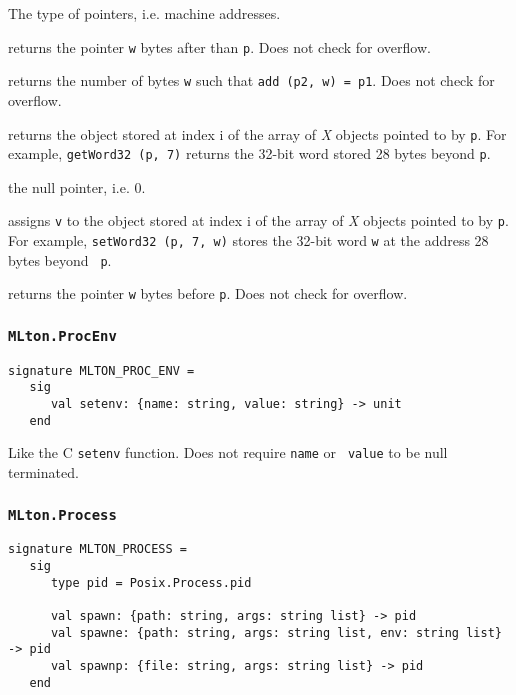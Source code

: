 \begin{description}
The type of pointers, i.e. machine addresses.

returns the pointer {\tt w} bytes after than {\tt p}.  Does not check
for overflow.

returns the number of bytes {\tt w} such that {\tt add (p2, w) = p1}.
Does not check for overflow.

returns the object stored at index i of the array of {\it X} objects
pointed to by {\tt p}.  For example, {\tt getWord32 (p, 7)} returns
the 32-bit word stored 28 bytes beyond {\tt p}.

the null pointer, i.e. 0.

assigns {\tt v} to the object stored at index i of the array of {\it
X} objects pointed to by {\tt p}.  For example, {\tt setWord32 (p, 7,
w)} stores the 32-bit word {\tt w} at the address 28 bytes beyond {\tt
p}.

returns the pointer {\tt w} bytes before {\tt p}.  Does not check for
overflow.

\end{description}
%
\subsubsection{\tt MLton.ProcEnv}

\begin{verbatim}
signature MLTON_PROC_ENV =
   sig
      val setenv: {name: string, value: string} -> unit
   end
\end{verbatim}

\begin{description}
Like the C {\tt setenv} function.  Does not require {\tt name} or {\tt
value} to be null terminated.
\end{description}
%
\subsubsection{\tt MLton.Process}

\begin{verbatim}
signature MLTON_PROCESS =
   sig
      type pid = Posix.Process.pid

      val spawn: {path: string, args: string list} -> pid
      val spawne: {path: string, args: string list, env: string list} -> pid
      val spawnp: {file: string, args: string list} -> pid
   end
\end{verbatim}

